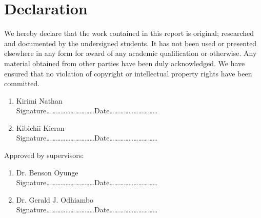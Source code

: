 \section*{Declaration}

We hereby declare that the work contained in this report is original; researched and documented by the undersigned students. It has not been used or presented elsewhere in any form for award of any academic qualification or otherwise. Any material obtained from other parties have been duly acknowledged. We have ensured that no violation of copyright or intellectual property rights have been committed.
\begin{enumerate}
	\item Kirimi Nathan\vspace*{.2cm}\\
	Signature\ldots\ldots\ldots\ldots\ldots\ldots\ldots\ldots\ldots\ldots Date\ldots\ldots\ldots\ldots\ldots\ldots\ldots\ldots\ldots\ldots
	\item Kibichii Kieran\vspace*{.2cm}\\
	Signature\ldots\ldots\ldots\ldots\ldots\ldots\ldots\ldots\ldots\ldots Date\ldots\ldots\ldots\ldots\ldots\ldots\ldots\ldots\ldots\ldots
\end{enumerate}

\vspace*{.5cm}
Approved by supervisors:
\begin{enumerate}
	\item Dr. Benson Oyunge\vspace*{.2cm}\\
	Signature\ldots\ldots\ldots\ldots\ldots\ldots\ldots\ldots\ldots\ldots Date\ldots\ldots\ldots\ldots\ldots\ldots\ldots\ldots\ldots\ldots
	\item Dr. Gerald J. Odhiambo \vspace*{.2cm}\\
	Signature\ldots\ldots\ldots\ldots\ldots\ldots\ldots\ldots\ldots\ldots Date\ldots\ldots\ldots\ldots\ldots\ldots\ldots\ldots\ldots\ldots
	\end{enumerate}


